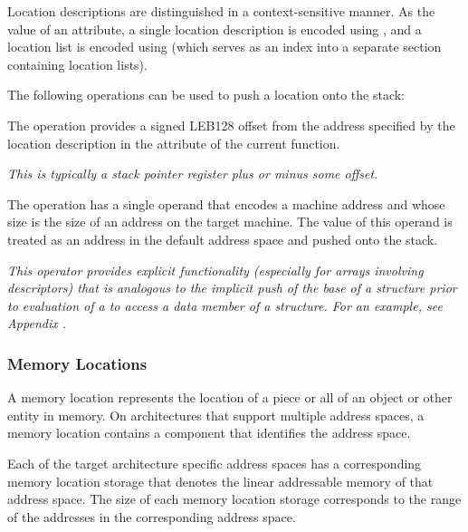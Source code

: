 Location descriptions are distinguished in a context-sensitive
manner. As the value of an attribute, a single location description is
encoded using \CLASSlocdesc, and a location list is encoded using
\CLASSloclist (which serves as an index into a separate section
containing location lists).

The following operations can be used to push a location onto the
stack:

\begin{enumerate}[1. ]
\itembfnl{\DWOPfbregTARG} The \DWOPfbregNAME{} operation provides a
signed LEB128 offset from the address
specified by the location description in the \DWATframebase{}
attribute of the current function.

\textit{This is typically a stack pointer register plus or minus some
offset.}
  
\itembfnl{\DWOPpushobjectaddressTARG}
The \DWOPpushobjectaddressNAME{} operation has a single operand that
encodes a machine address and whose size is the size of an address on
the target machine. The value of this operand is treated as an address
in the default address space and pushed onto the stack.

\textit{This operator provides explicit functionality
(especially for arrays involving descriptors) that is analogous
to the implicit push of the base
of a structure prior to evaluation of a
\DWATdatamemberlocation{}
to access a data member of a structure. For an example, see
Appendix .}


\end{enumerate}

\subsubsection{Memory Locations}
\label{chap:memorylocations}

A  memory location
 represents the location of a piece or
all of an object or other entity in memory. On architectures that
support multiple address spaces, a memory location contains a
component that identifies the address space.

Each of the target architecture specific address spaces has a
corresponding memory location storage that denotes the linear
addressable memory of that address space. The size of each memory
location storage corresponds to the range of the addresses in the
corresponding address space.

